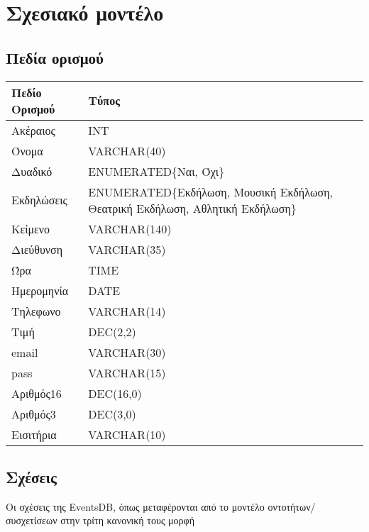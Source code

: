 ﻿
\section{Σχεσιακό μοντέλο}

\subsection{Πεδία ορισμού}


\begin{tabular}{|p{6cm}|p{8cm}|}
\hline
  Πεδίο Ορισμού & Τύπος                         \\ \hline
  Ακέραιος      & INT                           \\ \hline
  Όνομα         & VARCHAR(40)                   \\ \hline
  Δυαδικό       & ENUMERATED\{Ναι, Όχι\}        \\ \hline
  Εκδηλώσεις    & ENUMERATED\{Εκδήλωση, Μουσική Εκδήλωση, Θεατρική
                  Εκδήλωση, Αθλητική Εκδήλωση\} \\ \hline
  Κείμενο       & VARCHAR(140)                  \\ \hline
  Διεύθυνση     & VARCHAR(35)                   \\ \hline
  Ώρα           & TIME                          \\ \hline
  Ημερομηνία    & DATE                          \\ \hline
  Τηλεφωνο      & VARCHAR(14)                   \\ \hline
  Τιμή          & DEC(2,2)                      \\ \hline
  email         & VARCHAR(30)                   \\ \hline
  pass          & VARCHAR(15)                   \\ \hline
  Αριθμός16     & DEC(16,0)                     \\ \hline
  Αριθμός3      & DEC(3,0)                      \\ \hline
  Εισιτήρια     & VARCHAR(10)                   \\ \hline
\end{tabular}

\subsection{Σχέσεις}

Οι σχέσεις της EventsDB, όπως μεταφέρονται από το μοντέλο οντοτήτων/
συσχετίσεων στην τρίτη κανονική τους μορφή

